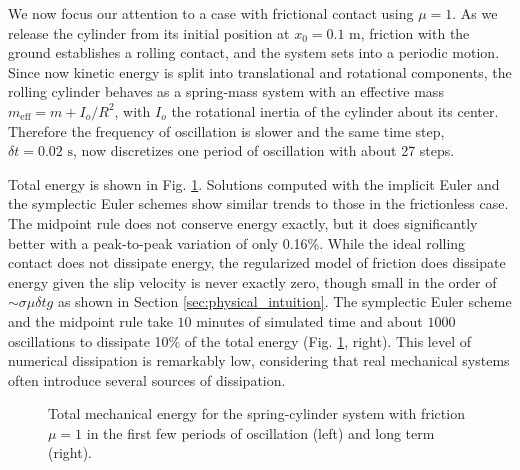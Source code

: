 We now focus our attention to a case with frictional contact using $\mu=1$. As
we release the cylinder from its initial position at $x_0=0.1\text{ m}$,
friction with the ground establishes a rolling contact, and the system sets into
a periodic motion. Since now kinetic energy is split into translational and
rotational components, the rolling cylinder behaves as a spring-mass system with
an effective mass $m_\text{eff}=m+I_o/R^2$, with $I_o$ the rotational inertia of
the cylinder about its center. Therefore the frequency of oscillation is slower
and the same time step, $\delta t=0.02\text{ s}$, now discretizes one
period of oscillation with about 27 steps.

Total energy is shown in Fig. \ref{fig:spring_cylinder_energy}. Solutions computed with the implicit
Euler and the symplectic Euler schemes show similar trends to those in the frictionless
case. The midpoint rule does not conserve energy exactly, but it does
significantly better with a peak-to-peak variation of only 0.16\%. While the
ideal rolling contact does not dissipate energy, the regularized model of
friction does dissipate energy given the slip velocity is never exactly zero,
though small in the order of $\sim\sigma\mu\delta t g$ as shown in Section
\ref{sec:physical_intuition}. The symplectic Euler scheme and the midpoint rule
take $10$ minutes of simulated time and about $1000$ oscillations to dissipate
10\% of the total energy (Fig. \ref{fig:spring_cylinder_energy}, right). This
level of numerical dissipation is remarkably low, considering that real mechanical systems often introduce several sources of dissipation.
\begin{figure}[!h]
    \centering
    \caption{\label{fig:spring_cylinder_energy} 
    Total mechanical energy for the spring-cylinder system with friction $\mu=1$
    in the first few periods of oscillation (left) and long term (right).}
\end{figure}

